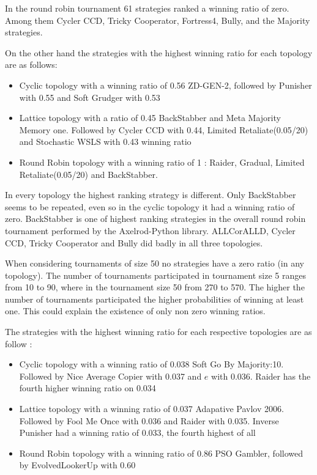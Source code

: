In the round robin tournament 61 strategies ranked a winning ratio of zero.
Among them Cycler CCD, Tricky Cooperator, Fortress4, Bully, and the Majority
strategies.

On the other hand the strategies with the highest winning ratio for each
topology are as follows:

\begin{itemize}
  \item Cyclic topology with a winning ratio of 0.56 ZD-GEN-2, followed by Punisher
        with 0.55 and Soft Grudger with 0.53
  \item Lattice topology with a ratio of 0.45 BackStabber and Meta Majority
        Memory one. Followed by Cycler CCD with 0.44, Limited Retaliate(0.05/20)
        and Stochastic WSLS with 0.43 winning ratio
  \item Round Robin topology with a winning ratio of 1 : Raider, Gradual, Limited
        Retaliate(0.05/20) and BackStabber.
\end{itemize}

In every topology the highest ranking strategy is different.
Only BackStabber seems to be repeated, even so in the cyclic
topology it had a winning ratio of zero. BackStabber is one of highest ranking
strategies in the overall round robin tournament performed by the Axelrod-Python
library. ALLCorALLD, Cycler CCD, Tricky Cooperator and Bully did badly in all
three topologies.

When considering tournaments of size 50 no strategies have a zero ratio
(in any topology). The number of tournaments participated in tournament size 5
ranges from 10 to 90, where in the tournament size 50 from 270 to 570. The higher
the number of tournaments participated the higher probabilities of winning at
least one. This could explain the existence of only non zero winning ratios.

The strategies with the highest winning ratio for each respective topologies are
as follow :

\begin{itemize}
  \item Cyclic topology with a winning ratio of 0.038 Soft Go By Majority:10.
        Followed by Nice Average Copier with 0.037 and \(e\) with 0.036. Raider
        has the fourth higher winning ratio on 0.034
  \item Lattice topology with a winning ratio of 0.037 Adapative Pavlov 2006.
        Followed by Fool Me Once with 0.036 and Raider with 0.035. Inverse
        Punisher had a winning ratio of 0.033, the fourth highest of all
  \item Round Robin topology with a winning ratio of 0.86 PSO Gambler, followed
        by EvolvedLookerUp with 0.60
\end{itemize}

